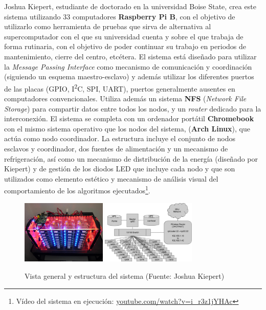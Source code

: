 Joshua Kiepert, estudiante de doctorado en la universidad Boise State, crea este sistema utilizando 33 computadores \textbf{Raspberry Pi B}, con el objetivo de utilizarlo como herramienta de pruebas que sirva de alternativa al supercomputador con el que su universidad cuenta\cite{joshuarpicluster} y sobre el que trabaja de forma rutinaria, con el objetivo de poder continuar su trabajo en periodos de mantenimiento, cierre del centro, etcétera. El sistema está diseñado para utilizar la \textit{Message Passing Interface} como mecanismo de comunicación y coordinación (siguiendo un esquema maestro-esclavo) y además utilizar los diferentes puertos de las placas (GPIO, I\textsuperscript{2}C, SPI, UART), puertos generalmente ausentes en computadores convencionales. Utiliza además un sistema \textbf{NFS} (\textit{Network File Storage}) para compartir datos entre todos los nodos, y un \textit{router} dedicado para la interconexión. El sistema se completa con un ordenador portátil \textbf{Chromebook} con el mismo sistema operativo que los nodos del sistema, (\textbf{Arch Linux}), que actúa como nodo coordinador. La estructura incluye el conjunto de nodos esclavos y coordinador, dos fuentes de alimentación y un mecanismo de refrigeración, así como un mecanismo de distribución de la energía (diseñado por Kiepert) y de gestión de los diodos LED que incluye cada nodo y que son utilizados como elemento estético y mecanismo de análisis visual del comportamiento de los algoritmos ejecutados\footnote{Vídeo del sistema en ejecución: \href{https://www.youtube.com/watch?v=i_r3z1jYHAc}{youtube.com/watch?v=i\_r3z1jYHAc}}.


\begin{figure}[H]
  \centering
  \includegraphics[width=0.36\textwidth]{Chapter4/Figures/kiepert-main}
  \includegraphics[width=0.4\textwidth]{Chapter4/Figures/kiepert.png}
  \caption[RPiCluster]{Vista general y estructura del sistema (Fuente: Joshua Kiepert)}
  \label{kiepert:structure}
\end{figure}

